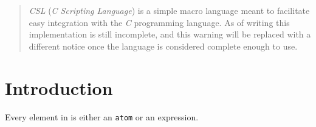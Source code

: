 \documentclass[11pt]{article}
\begin{document}
\maketitle

\begin{abstract}
\emph{CSL} (\emph{C Scripting Language}) is a simple macro language meant
to facilitate easy integration with the \emph{C} programming language. As
of writing this implementation is still incomplete, and this warning will
be replaced with a different notice once the language is considered
complete enough to use.
\end{abstract}

\section{Introduction}
Every element in \CSL{} is either an \verb+atom+ or an expression.




\end{document}
